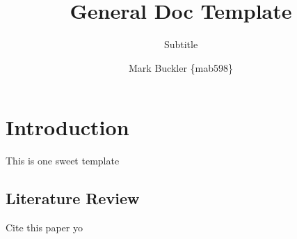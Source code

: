 \documentclass{cbxpset}
\title{General Doc Template}
\subtitle{Subtitle}
\author{Mark Buckler \{mab598\}}
\begin{document}
\maketitle

\section{Introduction}
\label{sec:intro}

This is one sweet template

\subsection{Literature Review}

Cite this paper yo \cite{einstein}


\end{document}
